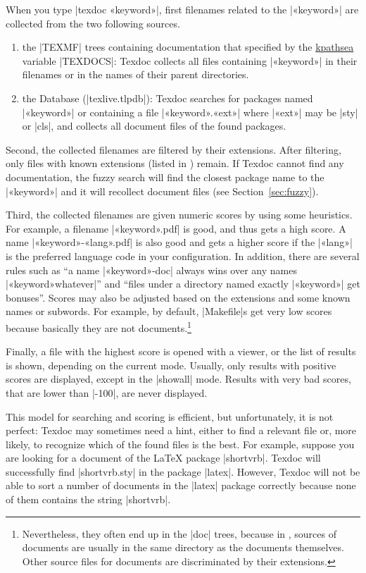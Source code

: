 \documentclass{texdoc-doc}
\begin{document}
When you type |texdoc «keyword»|, first filenames related to the |«keyword»|
are collected from the two following sources.
%
\begin{enumerate}
\item the |TEXMF| trees containing documentation that specified by the
  \href{https://www.tug.org/kpathsea/}{kpathsea} variable |TEXDOCS|: Texdoc
  collects all files containing |«keyword»| in their filenames or in the names
  of their parent directories.
\item the {\TL} Database (|texlive.tlpdb|): Texdoc searches for packages named
  |«keyword»| or containing a file |«keyword».«ext»| where |«ext»| may be |sty|
  or |cls|, and collects all document files of the found packages.
\end{enumerate}

Second, the collected filenames are filtered by their extensions. After
filtering, only files with known extensions (listed in ) remain.
If Texdoc cannot find any documentation, the fuzzy search will find the closest
package name to the |«keyword»| and it will recollect document files (see
Section~\ref{sec:fuzzy}).

Third, the collected filenames are given numeric scores by using some
heuristics. For example, a filename |«keyword».pdf| is good, and thus gets a
high score. A name |«keyword»-«lang».pdf| is also good and gets a higher score
if the |«lang»| is the preferred language code in your configuration. In
addition, there are several rules such as ``a name |«keyword»-doc| always wins
over any names |«keyword»whatever|'' and ``files under a directory named
exactly |«keyword»| get bonuses''. Scores may also be adjusted based on the
extensions and some known names or subwords. For example, by default,
|Makefile|s get very low scores because basically they are not
documents.\footnote{Nevertheless, they often end up in the |doc| trees,
because in {\TL}, sources of documents are usually in the same directory as the
documents themselves. Other source files for documents are discriminated by
their extensions.}

Finally, a file with the highest score is opened with a viewer, or the list
of results is shown, depending on the current mode. Usually, only results with
positive scores are displayed, except in the |showall| mode. Results with very
bad scores, that are lower than |-100|, are never displayed.

This model for searching and scoring is efficient, but unfortunately, it is not
perfect: Texdoc may sometimes need a hint, either to find a relevant file or,
more likely, to recognize which of the found files is the best. For example,
suppose you are looking for a document of the {\LaTeX} package |shortvrb|.
Texdoc will successfully find |shortvrb.sty| in the {\TL} package |latex|.
However, Texdoc will not be able to sort a number of documents in the |latex|
package correctly because none of them contains the string |shortvrb|.
\end{document}
